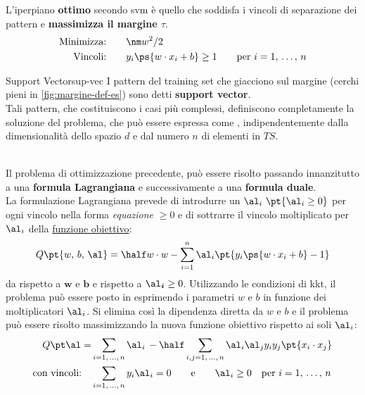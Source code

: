 L'iperpiano \textbf{ottimo} secondo \ac{svm} è quello che soddisfa i vincoli di separazione dei pattern e \textbf{massimizza il margine $\tau$}.
\begin{equation}\label{eq:vinc-svm-lin-sep}
    \begin{aligned}
        \text{Minimizza:}&\qquad \nm w ^2 / 2 \\
        \text{Vincoli:}&\qquad y_i\ps{w \cdot x_i + b} \ge 1 \qquad \text{per } i = 1,\,\dots,\,n
    \end{aligned}
\end{equation}
\begin{definition}{Support Vector}{sup-vec}
    I pattern del training set che giacciono sul margine (cerchi pieni in \cref{fig:margine-def-es}) sono detti \textbf{support vector}.
    \\
    Tali pattern, che costituiscono i casi più complessi, definiscono completamente la soluzione del problema, che può essere espressa come , indipendentemente dalla dimensionalità dello spazio $d$ e dal numero $n$ di elementi in $TS$.
\end{definition}
\\
Il problema di ottimizzazione precedente, può essere risolto passando innanzitutto a una \textbf{formula Lagrangiana} e successivamente a una \textbf{formula duale}.
\\
La formulazione Lagrangiana prevede di introdurre un  $\al_i\ \pt{\al_i \ge 0}$ per ogni vincolo nella forma \textit{equazione} $ \ge 0$ e di sottrarre il vincolo moltiplicato per $\al_i$ della \hyperref[sec:parametri_e_funzione_obiettivo]{funzione obiettivo}:
\[
    Q\pt{w,\,b,\,\al} = \half w\cdot w - \sum_{i = 1}^n{\al_i\pt{y_i\ps{w \cdot x_i + b} - 1}}
\]
da  rispetto a $\mathbf{w}$ e $\mathbf{b}$ e  rispetto a $\boldsymbol{\al_i} \ge 0$.
\emptyln{}
Utilizzando le condizioni di \ac{kkt}, il problema può essere posto in  esprimendo i parametri $w$ e $b$ in funzione dei moltiplicatori $\al_i$.
Si elimina così la dipendenza diretta da $w$ e $b$ e il problema può essere risolto massimizzando la nuova funzione obiettivo rispetto ai soli $\al_i$:
\begin{equation}\label{eq:kkt-cond-sep}
    \begin{aligned}
        Q\pt \al = &\sum_{i = 1,\,\dots,\,n}{\al_i}\, - \half \sum_{i,j = 1,\,\dots,\,n}{\al_i\al_j y_i y_j \pt{x_i\cdot x_j}} \\
        \text{con vincoli:}\quad &\sum_{i = 1,\,\dots,\,n}y_i\al_i = 0 \qquad \text{e} \qquad \al_i \ge 0 \quad \text{per } i = 1,\,\dots,\,n
    \end{aligned}
\end{equation}
